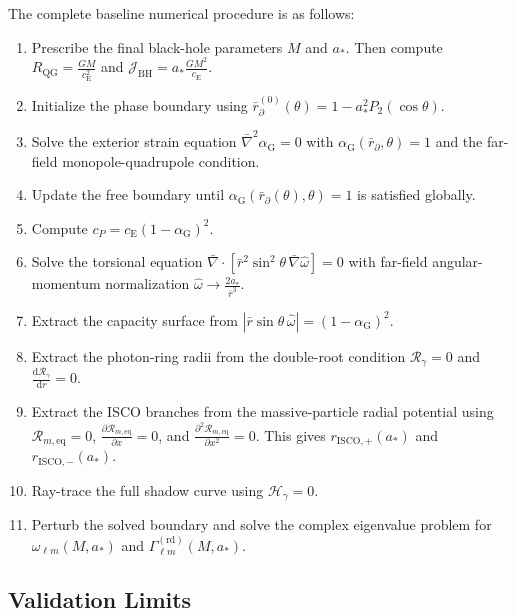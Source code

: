 The complete baseline numerical procedure is as follows:

\begin{enumerate}
    \item Prescribe the final black-hole parameters $M$ and $a_\ast$. Then compute $R_{\mathrm{QG}} = \frac{GM}{c_{\mathrm{E}}^2}$ and $\mathcal{J}_{\mathrm{BH}} = a_\ast \frac{GM^2}{c_{\mathrm{E}}}$.
    \item Initialize the phase boundary using $\bar{r}_{\partial}^{(0)}(\theta) = 1 - a_\ast^2P_2(\cos\theta)$.
    \item Solve the exterior strain equation $\bar{\nabla}^2\alpha_{\mathrm{G}}=0$ with $\alpha_{\mathrm{G}}(\bar{r}_{\partial},\theta)=1$ and the far-field monopole-quadrupole condition.
    \item Update the free boundary until $\alpha_{\mathrm{G}}(\bar{r}_{\partial}(\theta),\theta)=1$ is satisfied globally.
    \item Compute $c_P = c_{\mathrm{E}}(1-\alpha_{\mathrm{G}})^2$.
    \item Solve the torsional equation $\bar{\nabla}\cdot \left[ \bar{r}^2\sin^2\theta \, \bar{\nabla}\widehat{\omega} \right] = 0$ with far-field angular-momentum normalization $\widehat{\omega} \rightarrow \frac{2a_\ast}{\bar{r}^3}$.
    \item Extract the capacity surface from $\left| \bar{r}\sin\theta \, \widehat{\omega} \right| = (1-\alpha_{\mathrm{G}})^2$.
    \item Extract the photon-ring radii from the double-root condition $\mathcal{R}_{\gamma}=0$ and $\frac{\mathrm{d}\mathcal{R}_{\gamma}}{\mathrm{d}r}=0$.
    \item Extract the ISCO branches from the massive-particle radial potential using $\mathcal{R}_{m,\mathrm{eq}}=0$, $\frac{\partial\mathcal{R}_{m,\mathrm{eq}}}{\partial x}=0$, and $\frac{\partial^2\mathcal{R}_{m,\mathrm{eq}}}{\partial x^2}=0$. This gives $r_{\mathrm{ISCO},+}(a_\ast)$ and $r_{\mathrm{ISCO},-}(a_\ast)$.
    \item Ray-trace the full shadow curve using $\mathcal{H}_{\gamma}=0$.
    \item Perturb the solved boundary and solve the complex eigenvalue problem for $\omega_{\ell m}(M,a_\ast)$ and $\Gamma_{\ell m}^{(\mathrm{rd})}(M,a_\ast)$.
\end{enumerate}

\subsection{Validation Limits}

